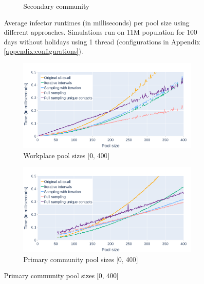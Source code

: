\begin{figure}
\begin{subfigure}{.8\linewidth}
        \caption{Secondary community}
        \label{fig:times_avg_fsuc_secondary_full}
    \end{subfigure}
    \caption{Average infector runtimes (in milliseconds) per pool size using different approaches. Simulations run on 11M population for 100 days without holidays using 1 thread (configurations in Appendix \ref{appendix:configurations}).}
    \label{fig:times_avg_fsuc_full}
\end{figure}

\begin{figure}
    \centering
    \begin{subfigure}{.8\linewidth}
        \centering
        \includegraphics[width=\textwidth]{4 - Sampling/fig/full_sampling_unique_contacts/times_avg_fsuc_workplace.png}
        \caption{Workplace pool sizes [0, 400]}
        \label{fig:times_avg_fsuc_workplace}
    \end{subfigure}
    \begin{subfigure}{.8\linewidth}
        \centering
        \includegraphics[width=\textwidth]{4 - Sampling/fig/full_sampling_unique_contacts/times_avg_fsuc_primary.png}
        \caption{Primary community pool sizes [0, 400]}
        \label{fig:times_avg_fsuc_primary}
    \end{subfigure}

\end{figure}
